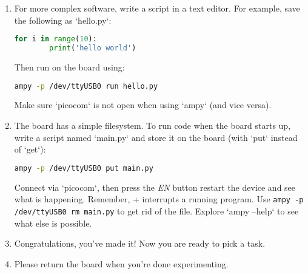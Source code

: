 \documentclass{../tutorial}
\begin{document}
\begin{enumerate}
\item
    For more complex software, write a script in a text editor.
    For example, save the following as `hello.py`:

    \begin{lstlisting}[language=python]
    for i in range(10):
        print('hello world')
    \end{lstlisting}

    Then run on the board using:

    \begin{lstlisting}[language=bash]
    ampy -p /dev/ttyUSB0 run hello.py
    \end{lstlisting}

    Make sure `picocom` is not open when using `ampy` (and vice versa).

\item
    The board has a simple filesystem.
    To run code when the board starts up,
    write a script named `main.py` and store it on the board (with `put`
    instead of `get`):

    \begin{lstlisting}[language=bash]
    ampy -p /dev/ttyUSB0 put main.py
    \end{lstlisting}

    Connect via `picocom`, then press the \emph{EN} button restart the device
    and see what is happening. Remember, + interrupts a
    running program.
    Use \lstinline[emph=rm]|ampy -p /dev/ttyUSB0 rm main.py|
    to get rid of the file.
    Explore `ampy --help` to see what else is possible.

\item
    Congratulations, you've made it! Now you are ready to pick a task.

\item
    Please return the board when you're done experimenting.

\end{enumerate}
\end{document}
